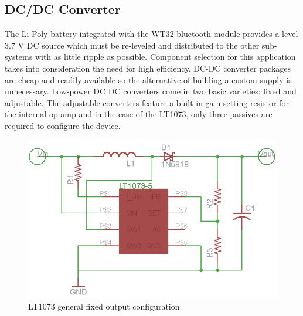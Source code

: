 \subsection{DC/DC Converter}

The Li-Poly battery integrated with the WT32 bluetooth module provides a level 3.7 V DC source which must be re-leveled and distributed to the other sub-systems with as little ripple as possible. Component selection for this application takes into consideration the need for high efficiency. DC-DC converter packages are cheap and readily available so the alternative of building a custom supply is unnecessary. Low-power DC DC converters come in two basic varieties: fixed and adjustable. The adjustable converters feature a built-in gain setting resistor for the internal op-amp and in the case of the LT1073, only three passives are required to configure the device. 


\begin{figure}[hbp]
\centering
\includegraphics[scale=0.5]{power_gen_fixed.png}
\caption[LT1073 Fixed Output Configuration]{LT1073 general fixed output configuration\cite{ds:lt1073}}
\end{figure}
